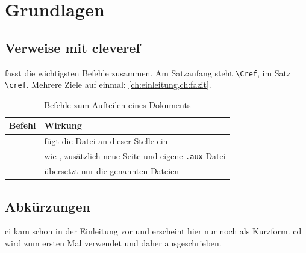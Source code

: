 \chapter{Grundlagen}
\label{ch:grundlagen}

\section{Verweise mit cleveref}
\label{sec:verweise}

 fasst die wichtigsten Befehle zusammen.
Am Satzanfang steht \verb|\Cref|, im Satz \verb|\cref|.
Mehrere Ziele auf einmal: \cref{ch:einleitung,ch:fazit}.

\begin{table}[ht]
  \centering
  \begin{tabular}{lp{7.5cm}}
    \toprule
    Befehl & Wirkung \\
    \midrule
    \verb||   & fügt die Datei an dieser Stelle ein \\
    \verb|| & wie \verb||, zusätzlich neue Seite und eigene \texttt{.aux}-Datei \\
    \verb|| & übersetzt nur die genannten Dateien \\
    \bottomrule
  \end{tabular}
  \caption{Befehle zum Aufteilen eines Dokuments}
  \label{tab:befehle}
\end{table}

\section{Abkürzungen}

\gls{ci} kam schon in der Einleitung vor und erscheint hier nur noch als Kurzform.
\gls{cd} wird zum ersten Mal verwendet und daher ausgeschrieben.
